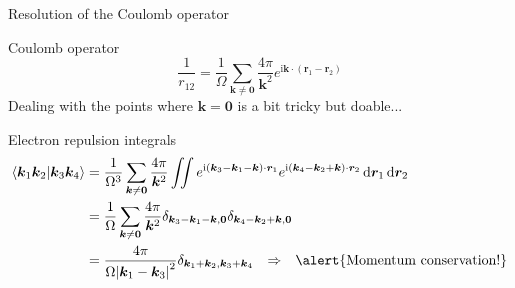\documentclass[aspectratio=169,9pt]{beamer}
\newcommand{\bk}{\boldsymbol{k}}
\newcommand{\br}{\boldsymbol{r}}
\newcommand{\bO}{\boldsymbol{0}}
\newcommand{\ii}{\mathrm{i}}
\begin{document}
\begin{frame}{Resolution of the Coulomb operator}
	\begin{block}{Coulomb operator}
		\begin{equation*}
			\frac{1}{r_{12}} 
			= \frac{1}{\Omega} \sum_{\bk \neq \bO} \frac{4\pi}{\bk^2} e^{\ii \bk \cdot (\br_1 - \br_2)}
		\end{equation*}
		Dealing with the points where $\bk = \bO$ is a bit tricky but doable...
	\end{block}
	\begin{block}{Electron repulsion integrals}
		\begin{equation*}
		\begin{split}
			\braket{\bk_1 \bk_2 }{\bk_3 \bk_4} 
			& =  \frac{1}{\Omega^3} \sum_{\bk\neq\bO} \frac{4\pi}{\bk^2} \iint e^{\ii \qty( \bk_3 - \bk_1 - \bk ) \cdot \br_1} e^{\ii \qty( \bk_4 - \bk_2 +\bk) \cdot \br_2} \dd{\br_1} \dd{\br_2} 
			\\
			& =  \frac{1}{\Omega} \sum_{\bk\neq\bO} \frac{4\pi}{\bk^2} \delta_{\bk_3-\bk_1-\bk,\bO} \delta_{\bk_4-\bk_2+\bk,\bO}
			\\
			& = \frac{4\pi}{\Omega \abs{\bk_1 - \bk_3}^2} \delta_{\bk_1+\bk_2,\bk_3+\bk_4}
			\qq{$\Rightarrow$}
			\alert{\text{Momentum conservation!}}
		\end{split}
		\end{equation*}
	\end{block}
\end{frame}
\end{document}
